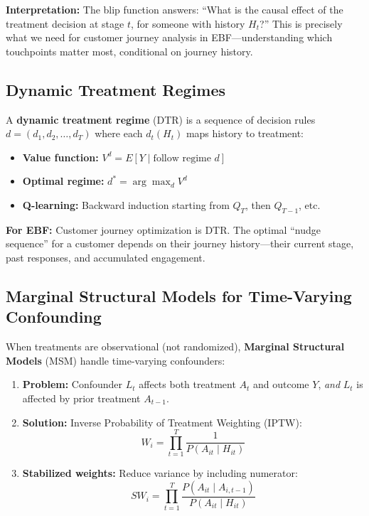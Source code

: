 \textbf{Interpretation:} The blip function answers: ``What is the causal effect of
the treatment decision at stage $t$, for someone with history $H_t$?'' This is
precisely what we need for customer journey analysis in EBF---understanding which
touchpoints matter most, conditional on journey history.

\subsection{Dynamic Treatment Regimes}

A \textbf{dynamic treatment regime} (DTR) \citep{PAP-murphy2003optimal} is a sequence
of decision rules $d = (d_1, d_2, \ldots, d_T)$ where each $d_t(H_t)$ maps history
to treatment:

\begin{itemize}
\item \textbf{Value function:} $V^d = E[Y \mid \text{follow regime } d]$
\item \textbf{Optimal regime:} $d^* = \arg\max_d V^d$
\item \textbf{Q-learning:} Backward induction starting from $Q_T$, then $Q_{T-1}$, etc.
\end{itemize}

\textbf{For EBF:} Customer journey optimization is DTR. The optimal ``nudge sequence''
for a customer depends on their journey history---their current stage, past responses,
and accumulated engagement.

\subsection{Marginal Structural Models for Time-Varying Confounding}

When treatments are observational (not randomized), \textbf{Marginal Structural Models}
(MSM) \citep{PAP-robins2000msm} handle time-varying confounders:

\begin{enumerate}
\item \textbf{Problem:} Confounder $L_t$ affects both treatment $A_t$ and outcome $Y$,
\emph{and} $L_t$ is affected by prior treatment $A_{t-1}$.

\item \textbf{Solution:} Inverse Probability of Treatment Weighting (IPTW):
\[
W_i = \prod_{t=1}^{T} \frac{1}{P(A_{it} \mid H_{it})}
\]

\item \textbf{Stabilized weights:} Reduce variance by including numerator:
\[
SW_i = \prod_{t=1}^{T} \frac{P(A_{it} \mid A_{i,t-1})}{P(A_{it} \mid H_{it})}
\]
\end{enumerate}


